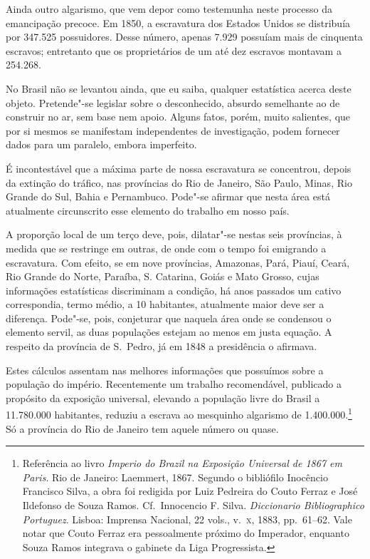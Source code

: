 \begin{linenumbers}
Ainda outro algarismo, que vem depor como testemunha neste processo da
emancipação precoce. Em 1850, a escravatura dos Estados Unidos se
distribuía por 347.525 possuidores. Desse número, apenas 7.929 possuíam
mais de cinquenta escravos; entretanto que os proprietários de um até
dez escravos montavam a 254.268.

No Brasil não se levantou ainda, que eu saiba, qualquer estatística
acerca deste objeto. Pretende"-se legislar sobre o desconhecido,
absurdo semelhante ao de construir no ar, sem base nem apoio. Alguns
fatos, porém, muito salientes, que por si mesmos se manifestam
independentes de investigação, podem fornecer dados para um paralelo,
embora imperfeito.

É incontestável que a máxima parte de nossa escravatura se concentrou,
depois da extinção do tráfico, nas províncias do Rio de Janeiro, São
Paulo, Minas, Rio Grande do Sul, Bahia e Pernambuco. Pode"-se afirmar
que nesta área está atualmente circunscrito esse elemento do trabalho
em nosso país.

A proporção local de um terço deve, pois, dilatar"-se nestas seis
províncias, à medida que se restringe em outras, de onde com o tempo
foi emigrando a escravatura. Com efeito, se em nove províncias,
Amazonas, Pará, Piauí, Ceará, Rio Grande do Norte, Paraíba, S.
Catarina, Goiás e Mato Grosso, cujas informações estatísticas
discriminam a condição, há anos passados um cativo correspondia, termo
médio, a 10 habitantes, atualmente maior deve ser a diferença.
Pode"-se, pois, conjeturar que naquela área onde se condensou o
elemento servil, as duas populações estejam ao menos em justa equação.
A respeito da província de S.~Pedro, já em 1848 a presidência o afirmava.

Estes cálculos assentam nas melhores informações que possuímos sobre a
população do império. Recentemente um trabalho recomendável, publicado
a propósito da exposição universal, elevando a população livre do
Brasil a 11.780.000 habitantes, reduziu a escrava ao mesquinho
algarismo de 1.400.000.\footnote{ Referência ao livro \textit{Imperio do Brazil na Exposição Universal de
1867 em Paris}. Rio de Janeiro: Laemmert, 1867. Segundo o bibliófilo
Inocêncio Francisco Silva, a obra foi redigida por Luiz Pedreira do
Couto Ferraz e José Ildefonso de Souza Ramos. Cf.~Innocencio F. Silva.
\textit{Diccionario Bibliographico Portuguez}. Lisboa: Imprensa
Nacional, 22 vols., v.~\textsc{x}, 1883, pp.~61--62. Vale notar que Couto
Ferraz era pessoalmente próximo do Imperador, enquanto Souza Ramos
integrava o gabinete da Liga Progressista.}
 Só a província do Rio de Janeiro tem aquele número ou quase.


\end{linenumbers}
